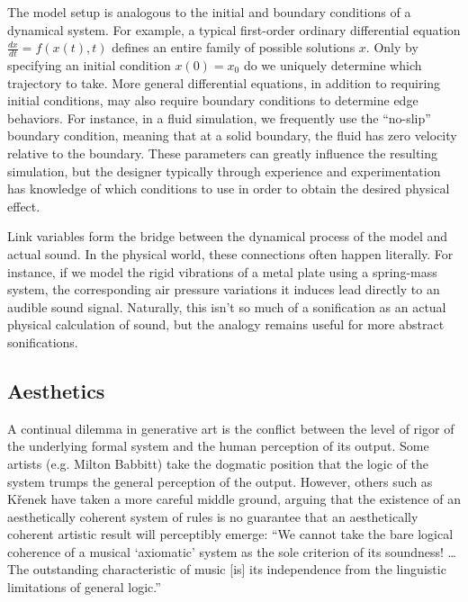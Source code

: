 The model setup is analogous to the initial and boundary conditions of a dynamical system. For example, a typical first-order ordinary differential equation $\frac{dx}{dt} = f(x(t), t)$ defines an entire family of possible solutions $x$. Only by specifying an initial condition $x(0) = x_0$ do we uniquely determine which trajectory to take. More general differential equations, in addition to requiring initial conditions, may also require boundary conditions to determine edge behaviors. For instance, in a fluid simulation, we frequently use the ``no-slip'' boundary condition, meaning that at a solid boundary, the fluid has zero velocity relative to the boundary. These parameters can greatly influence the resulting simulation, but the designer typically through experience and experimentation has knowledge of which conditions to use in order to obtain the desired physical effect.

Link variables form the bridge between the dynamical process of the model and actual sound. In the physical world, these connections often happen literally. For instance, if we model the rigid vibrations of a metal plate using a spring-mass system, the corresponding air pressure variations it induces lead directly to an audible sound signal. Naturally, this isn't so much of a sonification as an actual physical calculation of sound, but the analogy remains useful for more abstract sonifications. 

\subsection{Aesthetics}
A continual dilemma in generative art is the conflict between the level of rigor of the underlying formal system and the human perception of its output. Some artists (e.g. Milton Babbitt) take the dogmatic position that the logic of the system trumps the general perception of the output. \cite{babbitt1958cares}  However, others such as K{\v{r}}enek have taken a more careful middle ground, arguing that the existence of an aesthetically coherent system of rules is no guarantee that an aesthetically coherent artistic result will perceptibly emerge: ``We cannot take the bare logical coherence of a musical `axiomatic' system as the sole criterion of its soundness! \dots The outstanding characteristic of music [is] its independence from the linguistic limitations of general logic.'' \cite{kvrenek1939music}